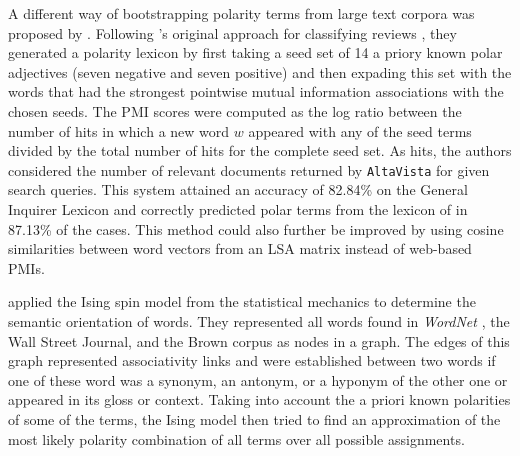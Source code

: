 A different way of bootstrapping polarity terms from large text
corpora was proposed by \citet{Turney:03}.  Following
\citeauthor{Turney:02}'s original approach for classifying reviews
\citep{Turney:02}, they generated a polarity lexicon by first taking a
seed set of 14 a priory known polar adjectives (seven negative and
seven positive) and then expading this set with the words that had the
strongest pointwise mutual information associations with the chosen
seeds.  The PMI scores were computed as the log ratio between the
number of hits in which a new word $w$ appeared with any of the seed
terms divided by the total number of hits for the complete seed set.
As hits, the authors considered the number of relevant documents
returned by \texttt{AltaVista} for given search queries.  This system
attained an accuracy of 82.84\% on the General Inquirer Lexicon
\citep{Stone:66} and correctly predicted polar terms from the lexicon
of \cite{Hatzivassi:97} in 87.13\% of the cases. This method could
also further be improved by using cosine similarities between word
vectors from an LSA matrix instead of web-based PMIs.



\citet{Takamura:05} applied the Ising spin model from the statistical
mechanics to determine the semantic orientation of words.  They
represented all words found in \emph{WordNet} \cite{Miller:95}, the
Wall Street Journal, and the Brown corpus as nodes in a graph.  The
edges of this graph represented associativity links and were
established between two words if one of these word was a synonym, an
antonym, or a hyponym of the other one or appeared in its gloss or
context.  Taking into account the a priori known polarities of some of
the terms, the Ising model then tried to find an approximation of the
most likely polarity combination of all terms over all possible
assignments.

